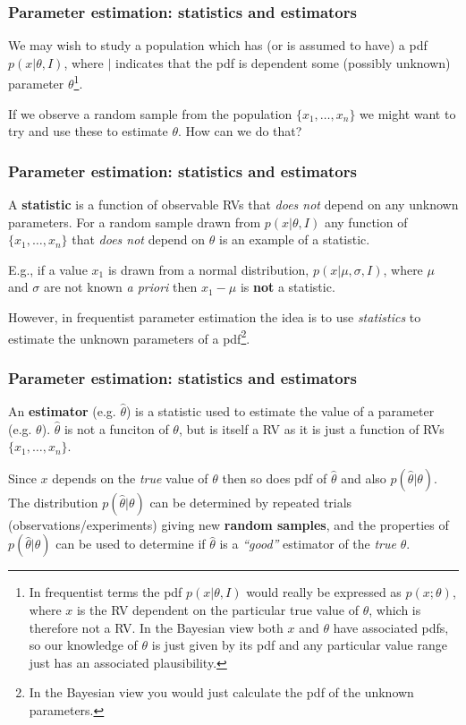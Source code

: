 \begin{frame}

\frametitle{Parameter estimation: statistics and estimators}
\label{parameterestimation:statisticsandestimators}

We may wish to study a population which has (or is assumed to have) a pdf $p(x|\theta,I)$, where $|$
indicates that the pdf is dependent some (possibly unknown) parameter $\theta$\footnote{In frequentist terms the pdf $p(x|\theta,I)$ would really be expressed as $p(x;\theta)$,
where $x$ is the RV dependent on the particular true value of $\theta$, which is therefore not a RV. In the
Bayesian view both $x$ and $\theta$ have associated pdfs, so our knowledge of
$\theta$ is just given by its pdf and any particular value range just has an associated plausibility.}.

If we observe a random sample from the population $\{x_1,\ldots,x_n\}$ we might want to try and use these
to estimate $\theta$. How can we do that?

\end{frame}

\begin{frame}

\frametitle{Parameter estimation: statistics and estimators}
\label{parameterestimation:statisticsandestimators}

A \textbf{statistic} is a function of observable RVs that \emph{does not} depend on any unknown parameters.
For a random sample drawn from $p(x|\theta,I)$ any function of $\{x_1,\ldots,x_n\}$ that \emph{does not}
depend on $\theta$ is an example of a statistic.

E.g., if a value $x_1$ is drawn from a normal distribution, $p(x|\mu,\sigma,I)$, where $\mu$ and $\sigma$ are not
known \emph{a priori} then $x_1-\mu$ is \textbf{not} a statistic.

However, in frequentist parameter estimation the idea is to use \emph{statistics} to estimate the unknown parameters
of a pdf\footnote{In the Bayesian view you would just calculate the pdf of the unknown parameters.}.

\end{frame}

\begin{frame}

\frametitle{Parameter estimation: statistics and estimators}
\label{parameterestimation:statisticsandestimators}

An \textbf{estimator} (e.g. $\hat{\theta}$) is a statistic used to estimate the value of a parameter (e.g. $\theta$).
$\hat{\theta}$ is not a funciton of $\theta$, but is itself a RV as it is just a function of RVs $\{x_1,\ldots,x_n\}$.

Since $x$ depends on the \emph{true} value of $\theta$ then so does pdf of $\hat{\theta}$ and also $p(\hat{\theta}|\theta)$.
The distribution $p(\hat{\theta}|\theta)$ can be determined by repeated trials (observations\slash experiments) giving new
\textbf{random samples}, and the properties of $p(\hat{\theta}|\theta)$ can be used to determine if $\hat{\theta}$ is
a \emph{``good''} estimator of the \emph{true} $\theta$.

\end{frame}

